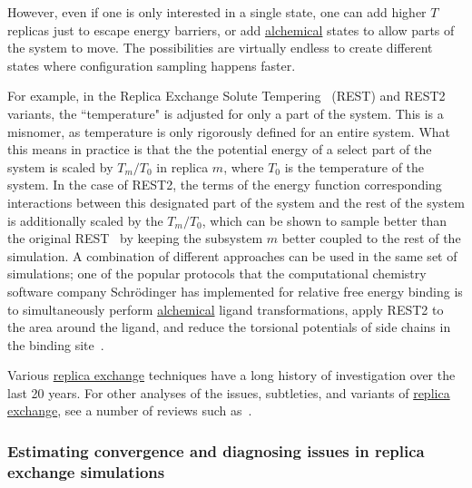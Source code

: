 \documentclass[9pt,review]{livecoms}
\begin{document}
However, even if one is only interested in a single state, one can add higher $T$ replicas just to escape energy barriers, or add \hyperlink{ref:Alchemical} {alchemical} states to allow parts of the system to move. The possibilities are virtually endless to create different states where configuration sampling happens faster.

For example, in the Replica Exchange Solute Tempering~\cite{REST1_Liu_2007} (REST) and REST2~\cite{REST2_Wang_2011} variants, the ``temperature" is adjusted for only a part of the system. This is a misnomer, as temperature is only rigorously defined for an entire system. What this means in practice is that the the potential energy of a select part of the system is scaled by  $T_m/T_0$ in replica $m$, where $T_0$ is the temperature of the system. In the case of REST2, the terms of the energy function corresponding interactions between this designated part of the system and the rest of the system is additionally scaled by the $T_m/T_0$, which can be shown to sample better than the original REST~\citep{REST2_Wang_2011} by keeping the subsystem $m$ better coupled to the rest of the simulation. A combination of different approaches can be used in the same set of simulations; one of the popular protocols that the computational chemistry software company Schr\"{o}dinger has implemented for relative free energy binding is to simultaneously perform \hyperlink{ref:Alchemical} {alchemical} ligand transformations, apply REST2 to the area around the ligand, and reduce the torsional potentials of side chains in the binding site~\cite{Wang:JCTC:2013}.


Various \hyperlink{ref:ReplEx} {replica exchange} techniques have a long history of investigation over the last 20 years. For other analyses of the issues, subtleties, and variants of \hyperlink{ref:ReplEx} {replica exchange}, see a number of reviews such as~\cite{Abrams:E:2014,Gallicchio:CPC:2015,Itoh:JCTC:2013,kofke:2002:jcp:acceptance-probability,Liu:CPL:2018,nadler-hansmann:pre:2007:optimized-replica-exchange-moves,Qi:PSMaP:2018,shenfeld-xu:pre:2009:thermodynamic-length,sindhikara-emerson-roitberg:jctc:2010:exchange-often-and-properly}.

\subsubsection{Estimating convergence and diagnosing issues in replica exchange simulations}
\end{document}
